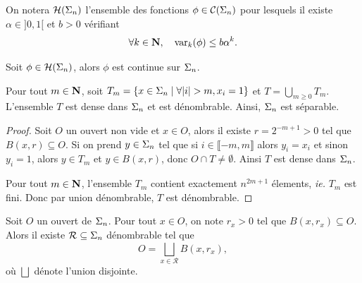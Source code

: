   \begin{definition}
    \label{def:holder_fn_set}
    \leanok
    On notera $\mathcal{H} (\Sigma_{n})$ l'ensemble des fonctions $\phi \in \mathcal{C} (\Sigma_{n})$ pour lesquels il existe $\alpha \in ]0, 1[$ et $b > 0$ vérifiant
    $$\forall k \in \mathbf N, \hspace{1em} \operatorname{var}_k(\phi) \leq b\alpha^k.$$
  \end{definition}

  \begin{proposition}
    \label{prop:holder_imp_continuous}
    \leanok
    Soit $\phi \in \mathcal{H} (\Sigma_{n})$, alors $\phi$ est continue sur $\Sigma_n$.
  \end{proposition}


  \begin{proposition}
    \label{prop:separable}
    \leanok
    Pour tout $m \in \mathbf N$, soit $T_m = \left\{x \in \s_n \mid \forall|i|>m, x_i=1\right\}$ et $T = \bigcup_{m\geq 0}{T_m}$.
    L'ensemble $T$ est dense dans $\Sigma_n$ et est dénombrable. Ainsi, $\Sigma_n$ est séparable.
  \end{proposition}

  \begin{proof}
    \leanok
    Soit $O$ un ouvert non vide et $x \in O$, alors il existe $r = 2^{-m+1} > 0$ tel que $B(x, r) \subseteq O$.
    Si on prend $y \in \Sigma_n$ tel que si $i \in \llbracket -m, m \rrbracket$ alors $y_i = x_i$ et sinon $y_i = 1$,
    alors $y \in T_m$ et $y \in B(x, r)$, donc $O \cap T \not= \emptyset$. Ainsi $T$ est dense dans $\Sigma_n$.

    Pour tout $m \in \mathbf N$, l'ensemble $T_m$ contient exactement $n^{2m+1}$ élements, \textit{ie.} $T_m$ est fini.
    Donc par union dénombrable, $T$ est dénombrable.
  \end{proof}

  \begin{proposition}
    \label{prop:boules}
    \leanok
    Soit $O$ un ouvert de $\Sigma_n$. Pour tout $x \in O$, on note $r_x > 0$ tel que $B(x, r_x) \subseteq O$.
    Alors il existe $\mathcal R \subseteq \Sigma_n$ dénombrable tel que
    $$O = \bigsqcup_{x\in\mathcal R}{B(x, r_x)},$$
    où $\bigsqcup$ dénote l'union disjointe.
  \end{proposition}

